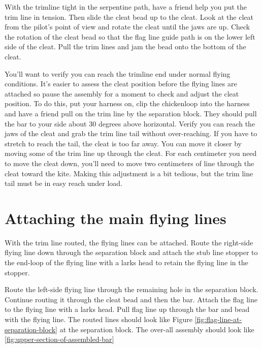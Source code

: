 \documentclass[
]{book}
\begin{document}
With the trimline tight in the serpentine path, have a friend help you put the trim line in tension. Then slide the cleat bead up to the cleat. Look at the cleat from the pilot's point of view and rotate the cleat until the jaws are up. Check the rotation of the cleat bead so that the flag line guide path is on the lower left side of the cleat. Pull the trim lines and jam the bead onto the bottom of the cleat.

You'll want to verify you can reach the trimline end under normal flying conditions. It's easier to assess the cleat position before the flying lines are attached so pause the assembly for a moment to check and adjust the cleat position. To do this, put your harness on, clip the chickenloop into the harness and have a friend pull on the trim line by the separation block. They should pull the bar to your side about 30 degrees above horizontal. Verify you can reach the jaws of the cleat and grab the trim line tail without over-reaching. If you have to stretch to reach the tail, the cleat is too far away. You can move it closer by moving some of the trim line up through the cleat. For each centimeter you need to move the cleat down, you'll need to move two centimeters of line through the cleat toward the kite. Making this adjustment is a bit tedious, but the trim line tail must be in easy reach under load.

\hypertarget{attaching-the-main-flying-lines}{%
\section{Attaching the main flying lines}\label{attaching-the-main-flying-lines}}

With the trim line routed, the flying lines can be attached. Route the right-side flying line down through the separation block and attach the stub line stopper to the end-loop of the flying line with a larks head to retain the flying line in the stopper.

Route the left-side flying line through the remaining hole in the separation block. Continue routing it through the cleat bead and then the bar. Attach the flag line to the flying line with a larks head. Pull flag line up through the bar and bead with the flying line. The routed lines should look like Figure \ref{fig:flag-line-at-separation-block} at the separation block. The over-all assembly should look like \ref{fig:upper-section-of-assembled-bar}
\end{document}
